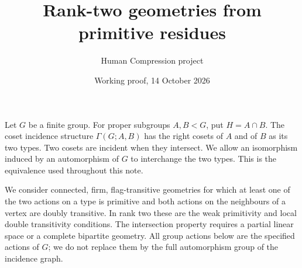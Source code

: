 \documentclass[11pt]{article}
\title{Rank-two geometries from primitive residues}
\author{Human Compression project}
\date{Working proof, 14 October 2026}
\begin{document}
\maketitle

Let $G$ be a finite group. For proper subgroups $A,B<G$, put $H=A\cap B$.
The coset incidence structure $\Gamma(G;A,B)$ has the right cosets of $A$
and of $B$ as its two types. Two cosets are incident when they intersect.
We allow an isomorphism induced by an automorphism of $G$ to interchange
the two types. This is the equivalence used throughout this note.

We consider connected, firm, flag-transitive geometries for which at least
one of the two actions on a type is primitive and both actions on the
neighbours of a vertex are doubly transitive. In rank two these are the
weak primitivity and local double transitivity conditions. The intersection
property requires a partial linear space or a complete bipartite geometry.
All group actions below are the specified actions of $G$; we do not replace
them by the full automorphism group of the incidence graph.
\end{document}
